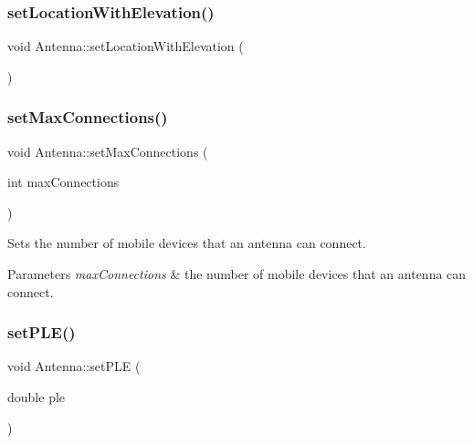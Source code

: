 \mbox{\label{class_antenna_a4b1d0ae147826e553a044fd481d6c7e0}} 
\subsubsection{\texorpdfstring{setLocationWithElevation()}{setLocationWithElevation()}}
{\footnotesize\ttfamily void Antenna\+::set\+Location\+With\+Elevation (\begin{DoxyParamCaption}{ }\end{DoxyParamCaption})\hspace{0.3cm}{\ttfamily [private]}}

\mbox{\label{class_antenna_ad844ed8507afb83b74b804c2434a4e50}} 
\subsubsection{\texorpdfstring{setMaxConnections()}{setMaxConnections()}}
{\footnotesize\ttfamily void Antenna\+::set\+Max\+Connections (\begin{DoxyParamCaption}\item[{int}]{max\+Connections }\end{DoxyParamCaption})}

Sets the number of mobile devices that an antenna can connect. 
\begin{DoxyParams}{Parameters}
{\em max\+Connections} & the number of mobile devices that an antenna can connect. \\
\hline
\end{DoxyParams}
\mbox{\label{class_antenna_ac0724f137d8e0af08d30ce2d07e6aa87}} 
\subsubsection{\texorpdfstring{setPLE()}{setPLE()}}
{\footnotesize\ttfamily void Antenna\+::set\+P\+LE (\begin{DoxyParamCaption}\item[{double}]{ple }\end{DoxyParamCaption})}

